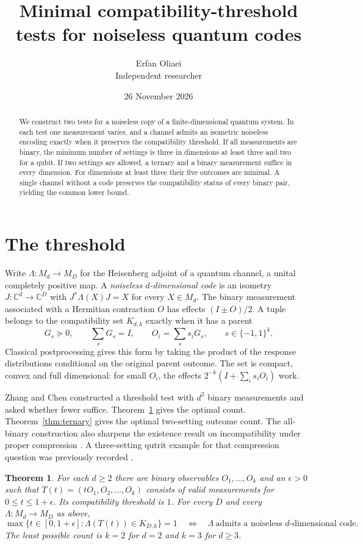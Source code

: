 \documentclass[10pt,a4paper]{article}
\author{Erfan Oliaei\\[2pt]\small Independent researcher}
\date{26 November 2026}
\title{Minimal compatibility-threshold tests for noiseless quantum codes}
\newtheorem{theorem}{Theorem}
\newcommand{\C}{\mathbb C}
\begin{document}
\maketitle
\begin{abstract}
We construct two tests for a noiseless copy of a finite-dimensional quantum system. In each test one measurement varies, and a channel admits an isometric noiseless encoding exactly when it preserves the compatibility threshold. If all measurements are binary, the minimum number of settings is three in dimensions at least three and two for a qubit. If two settings are allowed, a ternary and a binary measurement suffice in every dimension. For dimensions at least three their five outcomes are minimal. A single channel without a code preserves the compatibility status of every binary pair, yielding the common lower bound.
\end{abstract}

\section{The threshold}
Write \(\Lambda:M_d\to M_D\) for the Heisenberg adjoint of a quantum channel, a unital completely positive map. A \emph{noiseless \(d\)-dimensional code} is an isometry \(J:\C^d\to\C^D\) with
\(J^*\Lambda(X)J=X\) for every \(X\in M_d\). The binary measurement associated with a Hermitian contraction \(O\) has effects \((I\pm O)/2\).
A tuple belongs to the compatibility set \(K_{d,k}\) exactly when it has a parent
\begin{equation}\label{eq:parent}
 G_s\succeq0,\qquad \sum_s G_s=I,\qquad
 O_i=\sum_s s_iG_s,\qquad s\in\{-1,1\}^k .
\end{equation}
Classical postprocessing gives this form by taking the product of the response distributions conditional on the original parent outcome. The set is compact, convex and full dimensional: for small \(O_i\), the effects \(2^{-k}(I+\sum_i s_iO_i)\) work.

Zhang and Chen \cite{zc} constructed a threshold test with \(d^2\) binary measurements and asked whether fewer suffice. Theorem~\ref{thm:main} gives the optimal count. Theorem~\ref{thm:ternary} gives the optimal two-setting outcome count. The all-binary construction also sharpens the existence result on incompatibility under proper compression \cite{uola,zc}. A three-setting qutrit example for that compression question was previously recorded \cite{qutrit}.
\begin{theorem}\label{thm:main}
For each \(d\ge2\) there are binary observables \(O_1,\ldots,O_k\) and an \(\epsilon>0\) such that \(T(t)=(tO_1,O_2,\ldots,O_k)\) consists of valid measurements for \(0\le t\le1+\epsilon\). Its compatibility threshold is \(1\). For every \(D\) and every \(\Lambda:M_d\to M_D\) as above,
\[
 \max\{t\in[0,1+\epsilon]:\Lambda(T(t))\in K_{D,k}\}=1
 \quad\Longleftrightarrow\quad
 \Lambda\ \text{admits a noiseless \(d\)-dimensional code}.
\]
The least possible count is \(k=2\) for \(d=2\) and \(k=3\) for \(d\ge3\).
\end{theorem}
\end{document}
